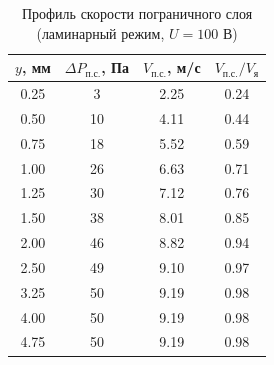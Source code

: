 \documentclass[12pt,a4paper]{article}
\begin{document}
\newpage


\begin{table}[H]
    \centering
    \caption{Профиль скорости пограничного слоя (ламинарный режим, $U = 100$ В)}
    \label{tab:laminar}
    \begin{tabular}{|c|c|c|c|} %
        \hline
        $y$, мм & $\Delta P_{\text{п.с.}}$, Па & $V_{\text{п.с.}}$, м/с & $V_{\text{п.с.}} / V_{\text{я}}$ \\
        \hline
        0.25 & 3   & 2.25 & 0.24 \\ \hline
        0.50 & 10  & 4.11 & 0.44 \\ \hline
        0.75 & 18  & 5.52 & 0.59 \\ \hline
        1.00 & 26  & 6.63 & 0.71 \\ \hline
        1.25 & 30  & 7.12 & 0.76 \\ \hline
        1.50 & 38  & 8.01 & 0.85 \\ \hline
        2.00 & 46  & 8.82 & 0.94 \\ \hline
        2.50 & 49  & 9.10 & 0.97 \\ \hline
        3.25 & 50  & 9.19 & 0.98 \\ \hline
        4.00 & 50  & 9.19 & 0.98 \\ \hline
        4.75 & 50  & 9.19 & 0.98 \\ \hline
    \end{tabular}
\end{table}
\end{document}
